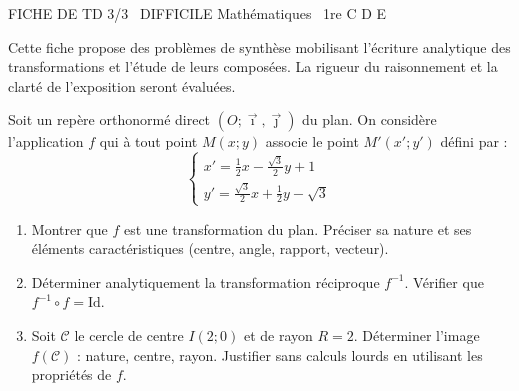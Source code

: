\documentclass[11pt]{article}
\begin{document}
\begin{tcolorbox}[enhanced,colback=popink,colframe=popink,arc=10pt,boxrule=0pt,left=12pt,right=12pt,top=9pt,bottom=9pt]
{\color{white}\popxbold\small FICHE DE TD 3/3 \textbullet\ DIFFICILE \hfill Mathématiques \textbullet\ 1re C D E\par}
\end{tcolorbox}
\vspace{4pt}
Cette fiche propose des problèmes de synthèse mobilisant l'écriture analytique des transformations et l'étude de leurs composées. La rigueur du raisonnement et la clarté de l'exposition seront évaluées.

\begin{exercice}
Soit un repère orthonormé direct $(O;\vec{\imath},\vec{\jmath})$ du plan. On considère l'application $f$ qui à tout point $M(x;y)$ associe le point $M'(x';y')$ défini par :
\[
\begin{cases}
x' = \frac{1}{2}x - \frac{\sqrt{3}}{2}y + 1 \\[2pt]
y' = \frac{\sqrt{3}}{2}x + \frac{1}{2}y - \sqrt{3}
\end{cases}
\]
\begin{enumerate}
    \item Montrer que $f$ est une transformation du plan. Préciser sa nature et ses éléments caractéristiques (centre, angle, rapport, vecteur).
    \item Déterminer analytiquement la transformation réciproque $f^{-1}$. Vérifier que $f^{-1} \circ f = \text{Id}$.
    \item Soit $\mathcal{C}$ le cercle de centre $I(2;0)$ et de rayon $R=2$. Déterminer l'image $f(\mathcal{C})$ : nature, centre, rayon. Justifier sans calculs lourds en utilisant les propriétés de $f$.
\end{enumerate}
\end{exercice}
\end{document}
